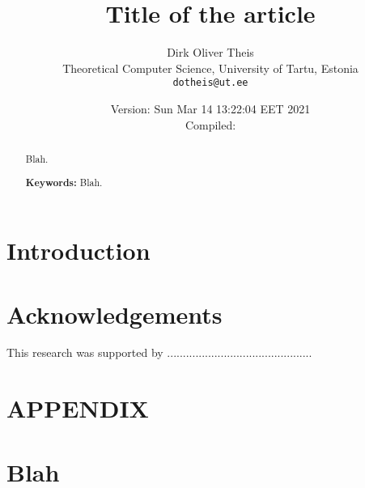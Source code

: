 \documentclass[a4paper,10pt,twoside,reqno,nonamelimits]{article}
\begin{document}
\title{Title of the article}
\author{Dirk Oliver Theis
\\[1ex]
  \small Theoretical Computer Science, University of Tartu, Estonia\\
  \small \texttt{dotheis@ut.ee}%
}
\date{Version: Sun Mar 14 13:22:04 EET 2021
  \\
  Compiled: \currenttime}
\maketitle

%
%
%
%
%
\begin{abstract}
  Blah.
  \par\medskip%
  \textbf{Keywords:} Blah.
\end{abstract}

\section{Introduction}\label{sec:intro}

\section*{Acknowledgements}
This research was supported by ..............................................




\appendix
\section*{APPENDIX}
\section{Blah}
\end{document}
